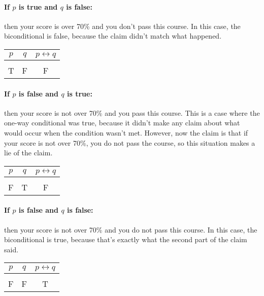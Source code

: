 \paragraph{If $p$ is true and $q$ is false:} then your score is over 70\% and you don't pass this course.  In this case, the biconditional is false, because the claim didn't match what happened.
\begin{center}
\begin{tabular}{c c c}
$p$ & $q$ & $p \leftrightarrow q$\\
\hline
& & \\
T & F & F
\end{tabular}
\end{center}

\paragraph{If $p$ is false and $q$ is true:} then your score is not over 70\% and you pass this course.  This is a case where the one-way conditional was true, because it didn't make any claim about what would occur when the condition wasn't met.  However, now the claim is that if your score is not over 70\%, you do not pass the course, so this situation makes a lie of the claim.
\begin{center}
\begin{tabular}{c c c}
$p$ & $q$ & $p \leftrightarrow q$\\
\hline
& & \\
F & T & F
\end{tabular}
\end{center}

\paragraph{If $p$ is false and $q$ is false:} then your score is not over 70\% and you do not pass this course.  In this case, the biconditional is true, because that's exactly what the second part of the claim said.
\begin{center}
\begin{tabular}{c c c}
$p$ & $q$ & $p \leftrightarrow q$\\
\hline
& & \\
F & F & T
\end{tabular}
\end{center}

